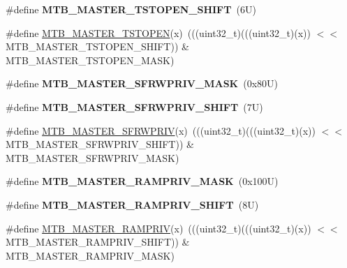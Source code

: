 \begin{DoxyCompactItemize}
\item 
\mbox{\label{group___m_t_b___register___masks_ga3b7209aa39e65d10758a0ea962d32e8a}} 
\#define {\bfseries M\+T\+B\+\_\+\+M\+A\+S\+T\+E\+R\+\_\+\+T\+S\+T\+O\+P\+E\+N\+\_\+\+S\+H\+I\+FT}~(6\+U)
\item 
\#define \mbox{\hyperlink{group___m_t_b___register___masks_ga93cf575b7e47719eeb8da5cd4fac5a81}{M\+T\+B\+\_\+\+M\+A\+S\+T\+E\+R\+\_\+\+T\+S\+T\+O\+P\+EN}}(x)~(((uint32\+\_\+t)(((uint32\+\_\+t)(x)) $<$$<$ M\+T\+B\+\_\+\+M\+A\+S\+T\+E\+R\+\_\+\+T\+S\+T\+O\+P\+E\+N\+\_\+\+S\+H\+I\+FT)) \& M\+T\+B\+\_\+\+M\+A\+S\+T\+E\+R\+\_\+\+T\+S\+T\+O\+P\+E\+N\+\_\+\+M\+A\+SK)
\item 
\mbox{\label{group___m_t_b___register___masks_ga445e1c53e9424d2e2c730fcd390009d7}} 
\#define {\bfseries M\+T\+B\+\_\+\+M\+A\+S\+T\+E\+R\+\_\+\+S\+F\+R\+W\+P\+R\+I\+V\+\_\+\+M\+A\+SK}~(0x80\+U)
\item 
\mbox{\label{group___m_t_b___register___masks_gae6e1de627837f38d2a5cab79cf13f295}} 
\#define {\bfseries M\+T\+B\+\_\+\+M\+A\+S\+T\+E\+R\+\_\+\+S\+F\+R\+W\+P\+R\+I\+V\+\_\+\+S\+H\+I\+FT}~(7\+U)
\item 
\#define \mbox{\hyperlink{group___m_t_b___register___masks_gad00c9dce249b79d1f009f2cfa1dc6656}{M\+T\+B\+\_\+\+M\+A\+S\+T\+E\+R\+\_\+\+S\+F\+R\+W\+P\+R\+IV}}(x)~(((uint32\+\_\+t)(((uint32\+\_\+t)(x)) $<$$<$ M\+T\+B\+\_\+\+M\+A\+S\+T\+E\+R\+\_\+\+S\+F\+R\+W\+P\+R\+I\+V\+\_\+\+S\+H\+I\+FT)) \& M\+T\+B\+\_\+\+M\+A\+S\+T\+E\+R\+\_\+\+S\+F\+R\+W\+P\+R\+I\+V\+\_\+\+M\+A\+SK)
\item 
\mbox{\label{group___m_t_b___register___masks_ga93d1c4a852b65c4f91c847930414e3bf}} 
\#define {\bfseries M\+T\+B\+\_\+\+M\+A\+S\+T\+E\+R\+\_\+\+R\+A\+M\+P\+R\+I\+V\+\_\+\+M\+A\+SK}~(0x100\+U)
\item 
\mbox{\label{group___m_t_b___register___masks_gadd17751eced675ec41c38640f7922cc3}} 
\#define {\bfseries M\+T\+B\+\_\+\+M\+A\+S\+T\+E\+R\+\_\+\+R\+A\+M\+P\+R\+I\+V\+\_\+\+S\+H\+I\+FT}~(8\+U)
\item 
\#define \mbox{\hyperlink{group___m_t_b___register___masks_gae4894b8c754082949e8bf8e11ba86d3a}{M\+T\+B\+\_\+\+M\+A\+S\+T\+E\+R\+\_\+\+R\+A\+M\+P\+R\+IV}}(x)~(((uint32\+\_\+t)(((uint32\+\_\+t)(x)) $<$$<$ M\+T\+B\+\_\+\+M\+A\+S\+T\+E\+R\+\_\+\+R\+A\+M\+P\+R\+I\+V\+\_\+\+S\+H\+I\+FT)) \& M\+T\+B\+\_\+\+M\+A\+S\+T\+E\+R\+\_\+\+R\+A\+M\+P\+R\+I\+V\+\_\+\+M\+A\+SK)
$$
\end{DoxyCompactItemize}
